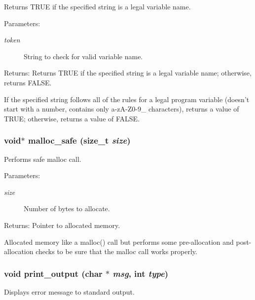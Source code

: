 Returns TRUE if the specified string is a legal variable name.

\begin{Desc}
\item[Parameters:]
\begin{description}
\item[{\em token}]String to check for valid variable name. \end{description}
\end{Desc}
\begin{Desc}
\item[Returns:]Returns TRUE if the specified string is a legal variable name; otherwise, returns FALSE.\end{Desc}
If the specified string follows all of the rules for a legal program variable (doesn't start with a number, contains only a-z\-A-Z0-9\_\- characters), returns a value of TRUE; otherwise, returns a value of FALSE. 
\subsubsection{\setlength{\rightskip}{0pt plus 5cm}void$\ast$ malloc\_\-safe (size\_\-t {\em size})}\label{util_8c_a19}


Performs safe malloc call.

\begin{Desc}
\item[Parameters:]
\begin{description}
\item[{\em size}]Number of bytes to allocate.\end{description}
\end{Desc}
\begin{Desc}
\item[Returns:]Pointer to allocated memory.\end{Desc}
Allocated memory like a malloc() call but performs some pre-allocation and post-allocation checks to be sure that the malloc call works properly. 
\subsubsection{\setlength{\rightskip}{0pt plus 5cm}void print\_\-output (char $\ast$ {\em msg}, int {\em type})}\label{util_8c_a7}


Displays error message to standard output.

